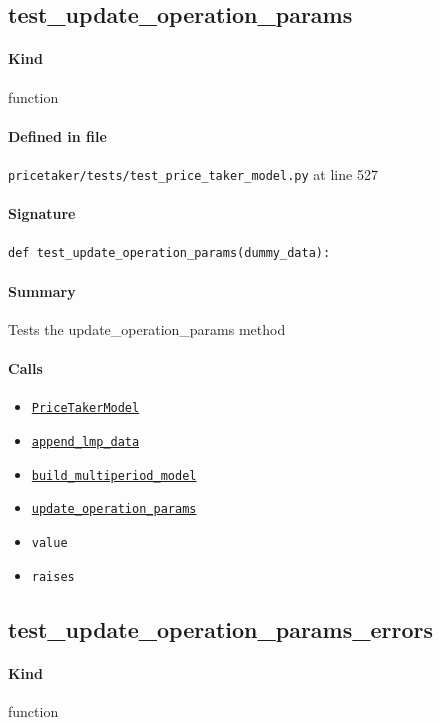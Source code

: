 \documentclass[11pt]{report}
\begin{document}
\subsection{test\_update\_operation\_params}
\label{def:pricetaker-tests-test_price_taker_model.py:test_update_operation_params:L527}
\paragraph{Kind} function
\paragraph{Defined in file} \texttt{pricetaker/tests/test\_price\_taker\_model.py} at line 527
\paragraph{Signature} \texttt{def test\_update\_operation\_params(dummy\_data):}
\paragraph{Summary} Tests the update\_operation\_params method
\paragraph{Calls}
\begin{itemize}[leftmargin=*]
  \item \hyperref[def:pricetaker-price_taker_model.py:PriceTakerModel:L161]{\texttt{PriceTakerModel}}
  \item \hyperref[def:pricetaker-price_taker_model.py:PriceTakerModel.append_lmp_data:L221]{\texttt{append\_lmp\_data}}
  \item \hyperref[def:pricetaker-price_taker_model.py:PriceTakerModel.build_multiperiod_model:L291]{\texttt{build\_multiperiod\_model}}
  \item \hyperref[def:pricetaker-price_taker_model.py:PriceTakerModel.update_operation_params:L530]{\texttt{update\_operation\_params}}
  \item \texttt{value}
  \item \texttt{raises}
\end{itemize}
\subsection{test\_update\_operation\_params\_errors}
\label{def:pricetaker-tests-test_price_taker_model.py:test_update_operation_params_errors:L551}
\paragraph{Kind} function
\end{document}
